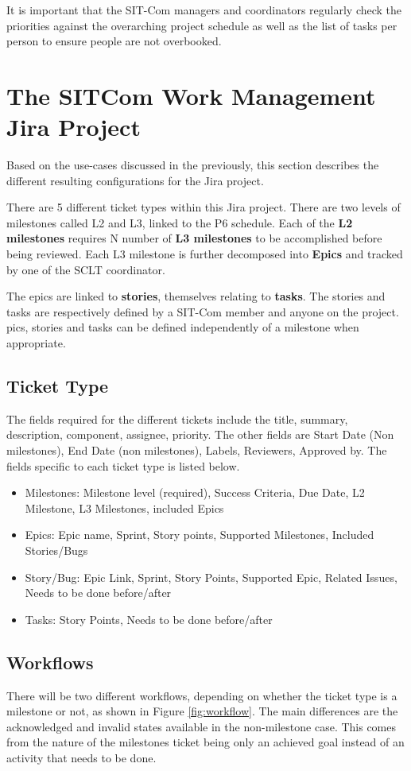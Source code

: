 \documentclass[SE,authoryear,toc]{lsstdoc}
\begin{document}
It is important that the SIT-Com managers and coordinators regularly check the priorities against the overarching project schedule as well as the list of tasks per person to ensure people are not overbooked. 




\section{The SITCom Work Management Jira Project }
Based on the use-cases discussed in the previously, this section describes the different resulting configurations for the Jira project. 

There are 5 different ticket types within this Jira project.
There are two levels of milestones called L2 and L3, linked to the P6 schedule. 
Each of the {\bf L2 milestones} requires N number of {\bf L3 milestones} to be accomplished before being reviewed. 
Each L3 milestone is further decomposed into {\bf Epics} and tracked by one of the SCLT coordinator. 

The epics are linked to {\bf stories}, themselves relating to {\bf tasks}. 
The stories and tasks are respectively defined by a SIT-Com member and anyone on the project. 
pics, stories and tasks can be defined independently of a milestone when appropriate.

\subsection{Ticket Type}
The fields required for the different tickets include the title, summary, description, component, assignee, priority. 
The other fields are Start Date (Non milestones), End Date (non milestones), Labels, Reviewers, Approved by.  
The fields specific to each ticket type is listed below.
\begin{itemize}
\item{Milestones}: Milestone level (required), Success Criteria, Due Date, L2 Milestone, L3 Milestones, included Epics
\item{Epics}: Epic name, Sprint, Story points, Supported Milestones, Included Stories/Bugs
\item{Story/Bug}: Epic Link, Sprint, Story Points, Supported Epic, Related Issues, Needs to be done before/after
\item{Tasks}: Story Points, Needs to be done before/after
\end{itemize}

\subsection{Workflows}
There will be two different workflows, depending on whether the ticket type is a milestone or not, as shown in Figure \ref{fig:workflow}. 
The main differences are the acknowledged and invalid states available in the non-milestone case.  
This comes from the nature of the milestones ticket being only an achieved goal instead of an activity that needs to be done. 
\end{document}
